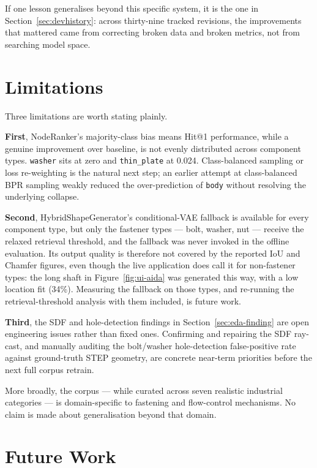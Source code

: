 \documentclass[12pt,oneside,a4paper]{report}
\begin{document}
If one lesson generalises beyond this specific system, it is the one in
Section~\ref{sec:devhistory}: across thirty-nine tracked revisions, the
improvements that mattered came from correcting broken data and broken
metrics, not from searching model space.

\section{Limitations}
\label{sec:limitations}

Three limitations are worth stating plainly.

\textbf{First}, NodeRanker's majority-class bias means Hit@1 performance,
while a genuine improvement over baseline, is not evenly distributed across
component types. \texttt{washer} sits at zero and \texttt{thin\_plate} at
0.024. Class-balanced sampling or loss re-weighting is the natural next step;
an earlier attempt at class-balanced BPR sampling weakly reduced the
over-prediction of \texttt{body} without resolving the underlying collapse.

\textbf{Second}, HybridShapeGenerator's conditional-VAE fallback is available
for every component type, but only the fastener types --- bolt, washer, nut ---
receive the relaxed retrieval threshold, and the fallback was never invoked in
the offline evaluation. Its output quality is therefore not covered by the
reported IoU and Chamfer figures, even though the live application does call
it for non-fastener types: the long shaft in Figure~\ref{fig:ui-aida} was
generated this way, with a low location fit (34\%). Measuring the fallback on
those types, and re-running the retrieval-threshold analysis with them
included, is future work.

\textbf{Third}, the SDF and hole-detection findings in
Section~\ref{sec:eda-finding} are open engineering issues rather than fixed
ones. Confirming and repairing the SDF ray-cast, and manually auditing the
bolt/washer hole-detection false-positive rate against ground-truth STEP
geometry, are concrete near-term priorities before the next full corpus
retrain.

More broadly, the corpus --- while curated across seven realistic industrial
categories --- is domain-specific to fastening and flow-control mechanisms.
No claim is made about generalisation beyond that domain.

\section{Future Work}
\end{document}
